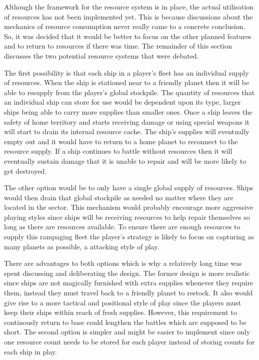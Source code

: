 Although the framework for the resource system is in place, the actual utilisation of resources has not been implemented yet. This is because discussions about the mechanics of resource consumption never really came to a concrete conclusion. So, it was decided that it would be better to focus on the other planned features and to return to resources if there was time. The remainder of this section discusses the two potential resource systems that were debated.


The first possibility is that each ship in a player's fleet has an individual supply of resources. When the ship is stationed near to a friendly planet then it will be able to resupply from the player's global stockpile. The quantity of resources that an individual ship can store for use would be dependent upon its type, larger ships being able to carry more supplies than smaller ones. Once a ship leaves the safety of home territory and starts receiving damage or using special weapons it will start to drain its internal resource cache. The ship's supplies will eventually empty out and it would have to return to a home planet to reconnect to the resource supply. If a ship continues to battle without resources then it will eventually sustain damage that it is unable to repair and will be more likely to get destroyed.

The other option would be to only have a single global supply of resources. Ships would then drain that global stockpile as needed no matter where they are located in the sector. This mechanism would probably encourage more aggressive playing styles since ships will be receiving resources to help repair themselves so long as there are resources available. To ensure there are enough resources to supply this rampaging fleet the player's strategy is likely to focus on capturing as many planets as possible, a attacking style of play.


There are advantages to both options which is why a relatively long time was spent discussing and deliberating the design. The former design is more realistic since ships are not magically furnished with extra supplies whenever they require them, instead they must travel back to a friendly planet to restock. It also would give rise to a more tactical and positional style of play since the players must keep their ships within reach of fresh supplies. However, this requirement to continously return to base could lengthen the battles which are supposed to be short. The second option is simpler and might be easier to implement since only one resource count needs to be stored for each player instead of storing counts for each ship in play.

